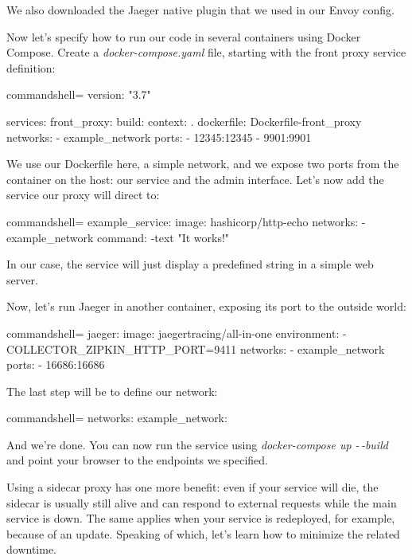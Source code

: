 We also downloaded the Jaeger native plugin that we used in our Envoy config.

Now let's specify how to run our code in several containers using Docker Compose. Create a \textit{docker-compose.yaml} file, starting with the front proxy service definition:


\begin{tcblisting}{commandshell={}}
version: "3.7"

services:
  front_proxy:
    build:
      context: .
      dockerfile: Dockerfile-front_proxy
    networks:
      - example_network
    ports:
      - 12345:12345
      - 9901:9901
\end{tcblisting}

We use our Dockerfile here, a simple network, and we expose two ports from the container on the host: our service and the admin interface. Let's now add the service our proxy will direct to:


\begin{tcblisting}{commandshell={}}
example_service:
  image: hashicorp/http-echo
  networks:
    - example_network
  command: -text "It works!"

\end{tcblisting}

In our case, the service will just display a predefined string in a simple web server.

Now, let's run Jaeger in another container, exposing its port to the outside world:


\begin{tcblisting}{commandshell={}}
jaeger:
  image: jaegertracing/all-in-one
  environment:
    - COLLECTOR_ZIPKIN_HTTP_PORT=9411
  networks:
    - example_network
  ports:
    - 16686:16686

\end{tcblisting}

The last step will be to define our network:

\begin{tcblisting}{commandshell={}}
  networks:
    example_network: {}
\end{tcblisting}

And we're done. You can now run the service using \textit{docker-compose up -\,-build} and point your browser to the endpoints we specified.

Using a sidecar proxy has one more benefit: even if your service will die, the sidecar is usually still alive and can respond to external requests while the main service is down. The same applies when your service is redeployed, for example, because of an update. Speaking of which, let's learn how to minimize the related downtime.


